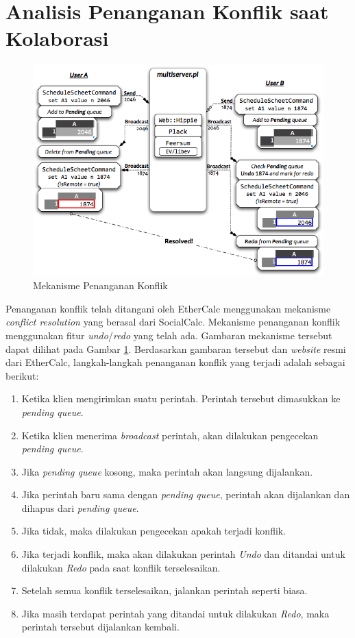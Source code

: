 \section{Analisis Penanganan Konflik saat Kolaborasi}

\begin{figure}[!htb]
    \centering
    \includegraphics[width=1\textwidth]{resources/chapter-3-conflict-res.png}
    \caption{Mekanisme Penanganan Konflik \citep{EtherCalc}}
	\label{MekanismeKonflik}
\end{figure}

Penanganan konflik telah ditangani oleh EtherCalc menggunakan mekanisme \textit{conflict resolution} yang berasal dari SocialCalc. Mekanisme penanganan konflik menggunakan fitur \textit{undo}/\textit{redo} yang telah ada. Gambaran mekanisme tersebut dapat dilihat pada Gambar \ref{MekanismeKonflik}. Berdasarkan gambaran tersebut dan \textit{website} resmi dari EtherCalc, langkah-langkah penanganan konflik yang terjadi adalah sebagai berikut:

\begin{enumerate}
	\item Ketika klien mengirimkan suatu perintah. Perintah tersebut dimasukkan ke \textit{pending queue}.
	\item Ketika klien menerima \textit{broadcast} perintah, akan dilakukan pengecekan \textit{pending queue}.
	\item Jika \textit{pending queue} kosong, maka perintah akan langsung dijalankan.
	\item Jika perintah baru sama dengan \textit{pending queue}, perintah akan dijalankan dan dihapus dari \textit{pending queue}.
	\item Jika tidak, maka dilakukan pengecekan apakah terjadi konflik.
	\item Jika terjadi konflik, maka akan dilakukan perintah \textit{Undo} dan ditandai untuk dilakukan \textit{Redo} pada saat konflik terselesaikan.
	\item Setelah semua konflik terselesaikan, jalankan perintah seperti biasa.
	\item Jika masih terdapat perintah yang ditandai untuk dilakukan \textit{Redo}, maka perintah tersebut dijalankan kembali.
\end{enumerate}


